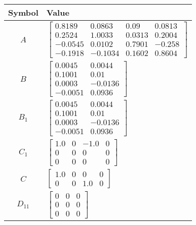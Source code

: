 \begin{tabular}{cl}
\hline
  Symbol  & Value                                                                                                                                                                                \\
\hline
   $A$    & $\left[\begin{matrix}0.8189 & 0.0863 & 0.09 & 0.0813\\0.2524 & 1.0033 & 0.0313 & 0.2004\\-0.0545 & 0.0102 & 0.7901 & -0.258\\-0.1918 & -0.1034 & 0.1602 & 0.8604\end{matrix}\right]$ \\
   $B$    & $\left[\begin{matrix}0.0045 & 0.0044\\0.1001 & 0.01\\0.0003 & -0.0136\\-0.0051 & 0.0936\end{matrix}\right]$                                                                          \\
 $B_{1}$  & $\left[\begin{matrix}0.0045 & 0.0044\\0.1001 & 0.01\\0.0003 & -0.0136\\-0.0051 & 0.0936\end{matrix}\right]$                                                                          \\
 $C_{1}$  & $\left[\begin{matrix}1.0 & 0 & -1.0 & 0\\0 & 0 & 0 & 0\\0 & 0 & 0 & 0\end{matrix}\right]$                                                                                            \\
   $C$    & $\left[\begin{matrix}1.0 & 0 & 0 & 0\\0 & 0 & 1.0 & 0\end{matrix}\right]$                                                                                                            \\
 $D_{11}$ & $\left[\begin{matrix}0 & 0 & 0\\0 & 0 & 0\\0 & 0 & 0\end{matrix}\right]$                                                                                                             \\

\end{tabular}
